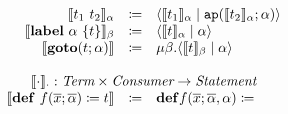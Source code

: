 \documentclass[nonacm]{acmart}
\newcommand{\translate}[1]{\ensuremath{\llbracket#1 \rrbracket}}
\newcommand{\cut}[2]{\ensuremath{\langle #1 \mid #2 \rangle}}
\begin{document}
\[\begin{array}{rcl}
    \translate{t_1\ t_2}_{\alpha} & \coloneq & \cut{\translate{t_1}_{\alpha}}{\mathtt{ap}(\translate{t_2}_{\alpha};\alpha)}\\
    \translate{\mathbf{label}\ \alpha\ \{t\}}_{\beta} & \coloneq & \cut{\translate{t}_{\alpha}}{\alpha}\\
    \translate{\mathbf{goto}(t;\alpha)} & \coloneq & \mu\beta.\cut{\translate{t}_{\beta}}{\alpha}\\
    \\
    \multicolumn{3}{c}{\translate{\cdot}_{\cdot} : \emph{Term}\times \emph{Consumer} \rightarrow \emph{Statement}}\\
    \translate{\mathbf{def}\ f(\overline{x};\overline{\alpha}) \coloneq t} & \coloneq & \mathbf{def}f(\overline{x};\overline{\alpha},\alpha) \coloneq 
  \end{array}
\]
\end{document}
